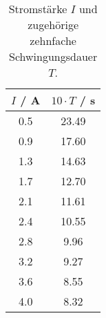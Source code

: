 \begin{table}[!htp]
\centering
\caption{Stromstärke $I$ und zugehörige zehnfache Schwingungsdauer $T$.}
\label{tab:schwing}
\begin{tabular}{c c}
\toprule
{$I$ / A} & {$10 \cdot T$ / s} \\
\midrule
0.5 & 23.49 \\
0.9 & 17.60 \\
1.3 & 14.63 \\
1.7 & 12.70 \\
2.1 & 11.61 \\
2.4 & 10.55 \\
2.8 &  9.96 \\
3.2 &  9.27 \\
3.6 &  8.55 \\
4.0 &  8.32 \\
\bottomrule
\end{tabular}
\end{table}